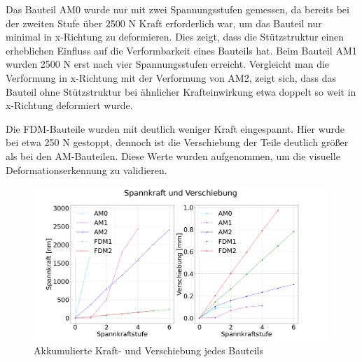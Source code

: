 Das Bauteil AM0 wurde nur mit zwei Spannungsstufen gemessen, 
da bereits bei der zweiten Stufe über 2500 N Kraft erforderlich war, 
um das Bauteil nur minimal in x-Richtung zu deformieren. Dies zeigt, 
dass die Stützstruktur einen erheblichen Einfluss auf die Verformbarkeit 
eines Bauteils hat. Beim Bauteil AM1 wurden 2500 N erst nach vier Spannungsstufen 
erreicht. Vergleicht man die Verformung in x-Richtung mit der Verformung von AM2,
 zeigt sich, dass das Bauteil ohne Stützstruktur bei ähnlicher Krafteinwirkung 
 etwa doppelt so weit in x-Richtung deformiert wurde.

 Die FDM-Bauteile wurden mit deutlich weniger Kraft eingespannt. 
 Hier wurde bei etwa 250 N gestoppt, dennoch ist die Verschiebung der 
 Teile deutlich größer als bei den AM-Bauteilen. Diese Werte wurden aufgenommen, 
 um die visuelle Deformationserkennung zu validieren.

\begin{figure}[H]
    \centering
    \includegraphics[width=0.99\textwidth]{images/spannkraftstufen_akkumuliert.png}
    \caption{Akkumulierte Kraft- und Verschiebung jedes Bauteils}
    \label{fig:akkumulated}
\end{figure}

